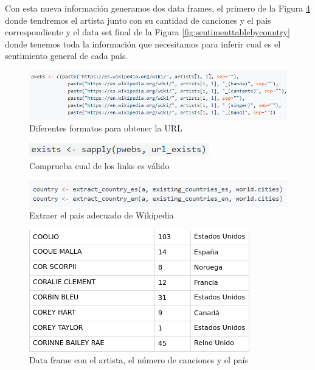 Con esta nueva información generamos dos data frames, el primero de la Figura \ref{fig:artistcountry} donde tendremos el artista junto con su cantidad de canciones y el pais correspondiente y el data set final de la Figura \ref{fig:sentimenttablebycountry} donde tenemos toda la información que necesitamos para inferir cual es el sentimiento general de cada país.

\begin{figure}[h]
	\centering
	\includegraphics[width=0.7\linewidth]{Imagenes/artists-wikipedia}
	\caption{Diferentes formatos para obtener la URL}
	\label{fig:artists-wikipedia}
\end{figure}

\begin{figure}[h]
	\centering
	\includegraphics[width=0.7\linewidth]{Imagenes/link-exists}
	\caption{Comprueba cual de los links es válido}
	\label{fig:link-exists}
\end{figure}

\begin{figure}[h]
	\centering
	\includegraphics[width=0.7\linewidth]{Imagenes/asignar-oais}
	\caption{Extraer el pais adecuado de Wikipedia}
	\label{fig:asignar-oais}
\end{figure}

\begin{figure}[h]
	\centering
	\includegraphics[width=0.7\linewidth]{Imagenes/artistcountry}
	\caption{Data frame con el artista, el número de canciones y el país}
	\label{fig:artistcountry}
\end{figure}

